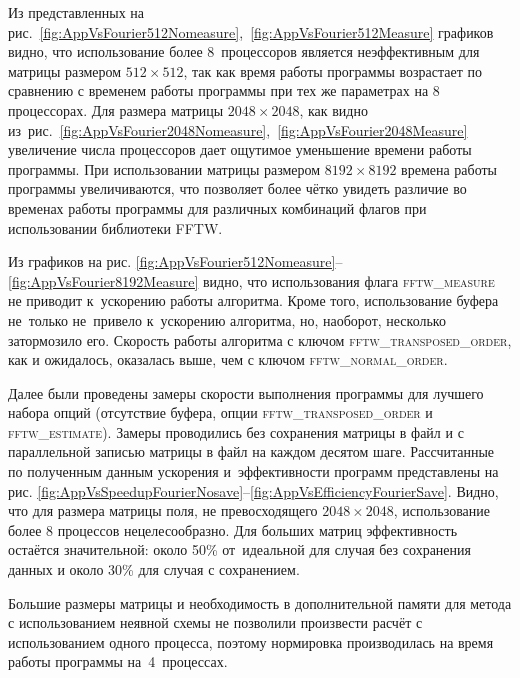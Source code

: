 Из представленных на рис.~\ref{fig:AppVsFourier512Nomeasure},~\ref{fig:AppVsFourier512Measure} графиков видно, что использование более 8~процессоров является неэффективным для матрицы размером $512\times512$,
так как время работы программы возрастает по сравнению с временем работы программы при тех же параметрах на 8 процессорах.
Для размера матрицы $2048\times2048$, как видно из~рис.~\ref{fig:AppVsFourier2048Nomeasure},~\ref{fig:AppVsFourier2048Measure} увеличение числа процессоров дает ощутимое уменьшение времени работы программы.
При использовании матрицы размером $8192\times8192$ времена работы программы увеличиваются,
что позволяет более чётко увидеть различие во временах работы программы для различных комбинаций флагов при использовании библиотеки FFTW.


Из графиков на рис. \ref{fig:AppVsFourier512Nomeasure}--\ref{fig:AppVsFourier8192Measure} видно,
что использования флага \textsc{fftw\_measure} не приводит к~ускорению работы алгоритма.
Кроме того, использование буфера не~только не~привело к~ускорению алгоритма, но, наоборот, несколько затормозило его.
Скорость работы алгоритма с ключом \textsc{fftw\_transposed\_order}, как и ожидалось, оказалась выше, чем с ключом \textsc{fftw\_normal\_order}.


Далее были проведены замеры скорости выполнения программы для лучшего набора опций (отсутствие буфера, опции \textsc{fftw\_transposed\_order} и \textsc{fftw\_estimate}).
Замеры проводились без сохранения матрицы в файл и с параллельной записью матрицы в файл на каждом десятом шаге.
Рассчитанные по полученным данным ускорения и~эффективности программ представлены на рис. \ref{fig:AppVsSpeedupFourierNosave}--\ref{fig:AppVsEfficiencyFourierSave}.
Видно, что для размера матрицы поля, не превосходящего $2048\times2048$, использование более 8 процессов нецелесообразно.
Для больших матриц эффективность остаётся значительной: около 50\% от~идеальной для случая без сохранения данных и около 30\% для случая с сохранением.

Большие размеры матрицы и необходимость в дополнительной памяти для метода с использованием неявной схемы не позволили произвести расчёт с использованием одного процесса,
поэтому нормировка производилась на время работы программы на~4~процессах.


    \newpage

